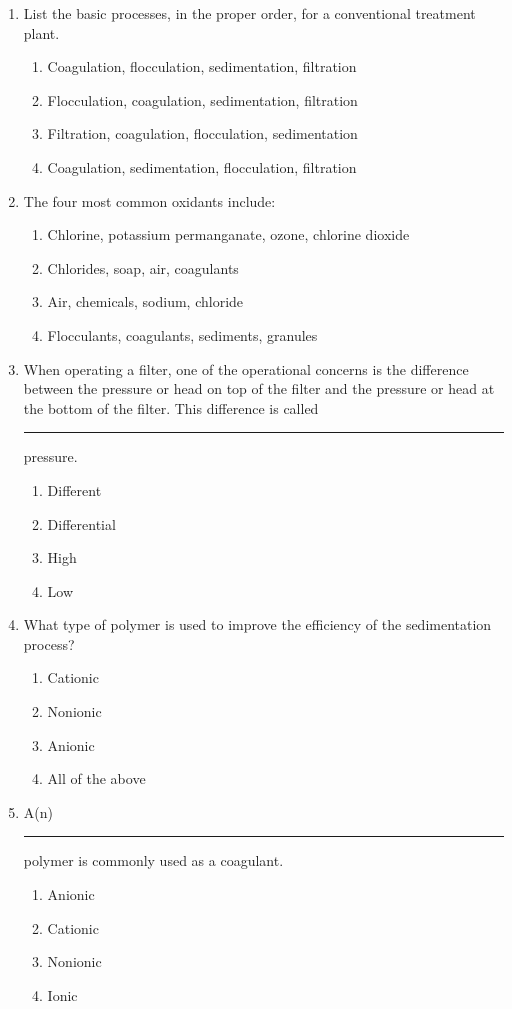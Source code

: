 \documentclass{article}
\begin{document}
\begin{enumerate}
\item List the basic processes, in the proper order, for a conventional treatment plant.
\begin{enumerate}
\item Coagulation, flocculation, sedimentation, filtration
\item Flocculation, coagulation, sedimentation, filtration
\item Filtration, coagulation, flocculation, sedimentation
\item Coagulation, sedimentation, flocculation, filtration
\end{enumerate}

\item The four most common oxidants include:
\begin{enumerate}
\item Chlorine, potassium permanganate, ozone, chlorine dioxide
\item Chlorides, soap, air, coagulants
\item Air, chemicals, sodium, chloride
\item Flocculants, coagulants, sediments, granules
\end{enumerate}

\item  When operating a filter, one of the operational concerns is the difference between the pressure or head on top of the filter and the pressure or head at the bottom of the filter. This difference is called \rule{2cm}{0.3pt} pressure.
\begin{enumerate}
\item Different
\item Differential
\item High
\item Low
\end{enumerate}

\item  What type of polymer is used to improve the efficiency of the sedimentation
process?
\begin{enumerate}
\item Cationic
\item Nonionic
\item Anionic
\item All of the above
\end{enumerate}

\item A(n) \rule{2cm}{0.3pt} polymer is commonly used as a coagulant.
\begin{enumerate}
\item Anionic
\item Cationic
\item Nonionic
\item Ionic
\end{enumerate}



\end{enumerate}
\end{document}
